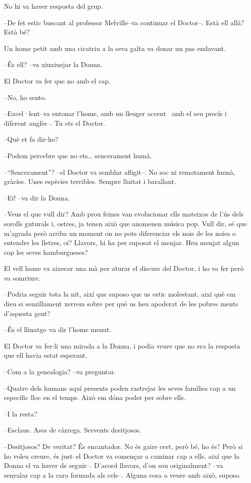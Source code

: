 No hi va haver resposta del grup.

--De fet estic buscant al professor Melville--va continuar el Doctor--.
Està ell allà? Està bé?

Un home petit amb una cicatriu a la seva galta va donar un pas endavant.

--És ell? --va xiuxiuejar la Donna.

El Doctor va fer que no amb el cap.

--No, ho sento.

--Excel·lent--va entonar l'home, amb un lleuger accent ~amb el seu
precís i diferent anglès--. Tu ets el Doctor.

--Què et fa dir-ho?

--Podem percebre que no ets\ldots{} sencerament humà.

--``Sencerament''? --el Doctor va semblar afligit--. No soc ni
remotament humà, gràcies. Unes espècies terribles. Sempre lluitat i
barallant.

--Ei! --va dir la Donna.

--Veus el que vull dir? Amb prou feines van evolucionar ells mateixos de
l'ús dels sorolls guturals i, ostres, ja tenen això que anomenen música
pop. Vull dir, sé que m'agrada però arriba un moment on no pots
diferenciar els nois de les noies o entendre les lletres, oi? Llavors,
hi ha per suposat el menjar. Heu menjat algun cop les seves
hamburgueses?

El vell home va aixecar una mà per aturar el discurs del Doctor, i ho va
fer però va somriure.

--Podria seguir tota la nit, així que suposo que us estic molestant,
així què em dieu si senzillament xerrem sobre per què us heu apoderat de
les pobres ments d'aquesta gent?

--És el llinatge--va dir l'home menut.

El Doctor va fer-li una mirada a la Donna, i podia veure que no era la
resposta que ell havia estat esperant.

--Com a la genealogia? --va preguntar.

--Quatre dels humans aquí presents poden rastrejar les seves famílies
cap a un específic lloc en el temps. Això em dóna poder per sobre ells.

--I la resta?

--Esclaus. Ases de càrrega. Servents desitjosos.

--Desitjosos? De veritat? És encantador. No és gaire cert, però bé, ho
és? Però si ho voleu creure, és just--el Doctor va començar a caminar
cap a ells, així que la Donna el va haver de seguir--. D'acord llavors,
d'on sou originalment? --va senyalar cap a la cara formada als cels--.
Alguna cosa a veure amb això, suposo.

